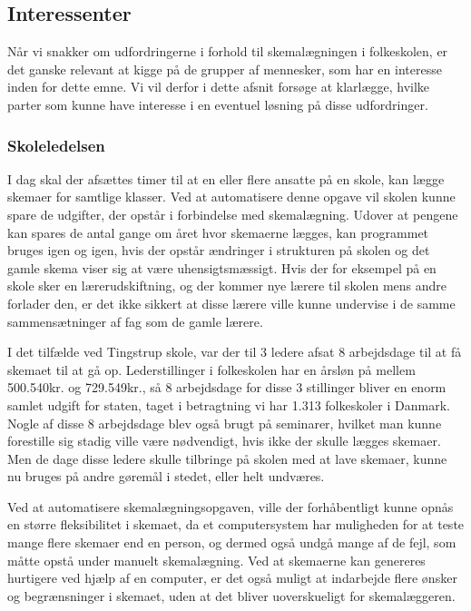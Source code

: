 \subsection{Interessenter}
Når vi snakker om udfordringerne i forhold til skemalægningen i folkeskolen, er det ganske relevant at kigge på de grupper af mennesker, som har en interesse inden for dette emne. Vi vil derfor i dette afsnit forsøge at klarlægge, hvilke parter som kunne have interesse i en eventuel løsning på disse udfordringer.

\subsubsection{Skoleledelsen}
I dag skal der afsættes timer til at en eller flere ansatte på en skole, kan lægge skemaer for samtlige klasser. Ved at automatisere denne opgave vil skolen kunne spare de udgifter, der opstår i forbindelse med skemalægning. Udover at pengene kan spares de antal gange om året hvor skemaerne lægges, kan programmet bruges igen og igen, hvis der opstår ændringer i strukturen på skolen og det gamle skema viser sig at være uhensigtsmæssigt. Hvis der for eksempel på en skole sker en lærerudskiftning, og der kommer nye lærere til skolen mens andre forlader den, er det ikke sikkert at disse lærere ville kunne undervise i de samme sammensætninger af fag som de gamle lærere.

I det tilfælde ved Tingstrup skole, var der til 3 ledere afsat 8 arbejdsdage til at få skemaet til at gå op. Lederstillinger i folkeskolen har en årsløn på mellem 500.540kr. og 729.549kr.\cite{Statens_adm}\cite{TR_HAANDBOGEN}, så 8 arbejdsdage for disse 3 stillinger bliver en enorm samlet udgift for staten, taget i betragtning vi har 1.313 folkeskoler i Danmark\cite{UVM-Folkeskoler}. Nogle af disse 8 arbejdsdage blev også brugt på seminarer, hvilket man kunne forestille sig stadig ville være nødvendigt, hvis ikke der skulle lægges skemaer. Men de dage disse ledere skulle tilbringe på skolen med at lave skemaer, kunne nu bruges på andre gøremål i stedet, eller helt undværes.

Ved at automatisere skemalægningsopgaven, ville der forhåbentligt kunne opnås en større fleksibilitet i skemaet, da et computersystem har muligheden for at teste mange flere skemaer end en person, og dermed også undgå mange af de fejl, som måtte opstå under manuelt skemalægning. Ved at skemaerne kan genereres hurtigere ved hjælp af en computer, er det også muligt at indarbejde flere ønsker og begrænsninger i skemaet, uden at det bliver uoverskueligt for skemalæggeren. 

